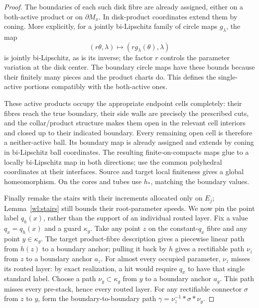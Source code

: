 \begin{proof}
The boundaries of each such disk fibre are already assigned, either
on a both-active product or on $\partial M_x$.  In disk-product
coordinates extend them by coning.  More explicitly, for a jointly
bi-Lipschitz family of circle maps $g_\lambda$, the map
\[
 (r\theta,\lambda)\longmapsto
             (r g_\lambda(\theta),\lambda)
\]
is jointly bi-Lipschitz, as is its inverse; the factor $r$ controls
the parameter variation at the disk center.  The boundary circle
maps have these bounds because their finitely many pieces and the
product charts do.  This defines the single-active portions
compatibly with the both-active ones.

These active products occupy the appropriate endpoint cells
completely: their fibres reach the true boundary, their side walls
are precisely the prescribed cuts, and the collar/product
structure makes them open in the relevant cell interiors and
closed up to their indicated boundary.  Every remaining open cell
is therefore a neither-active ball.  Its boundary map is already
assigned and extends by coning in bi-Lipschitz ball coordinates.
The resulting finite-on-compacts maps glue to a locally
bi-Lipschitz map in both directions; use the common polyhedral
coordinates at their interfaces.  Source and target local
finiteness gives a global homeomorphism.  On the cores and tubes
use $h_*$, matching the boundary values.

Finally remake the stairs with their increments allocated only on
$E_j$; Lemma~\ref{wl:stairs} still bounds their root-parameter speeds.
We now pin the point label $q_h(x)$, rather than the support of an
individual routed layer.  Fix a value $q_x=q_h(x)$ and a guard
$\kappa_g$.  Take any point
$z$ on the constant-$q_x$ fibre and any point $y\in\kappa_g$.
The target product-fibre description gives a piecewise linear path
from $h(z)$ to a boundary anchor; pulling it back by $h$ gives
a rectifiable path $\nu_z$ from $z$ to a boundary anchor $a_z$.
For almost every occupied parameter, $\nu_z$ misses its routed
layer: by exact realization, a hit would require $q_x$ to have that
single standard label.  Choose a path $\nu_y\subset\kappa_g$
from $y$ to a boundary anchor $a_g$.  This path misses every
pre-stack, hence every routed layer.  For any rectifiable connector
$\sigma$ from $z$ to $y$, form the boundary-to-boundary path
$\gamma=\nu_z^{-1}*\sigma*\nu_y$.


\end{proof}

